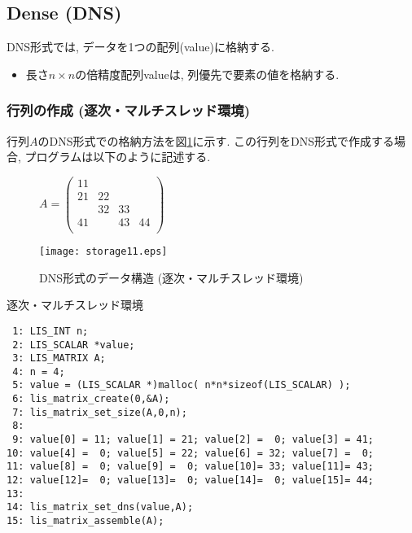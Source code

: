 \documentclass[a4paper]{jarticle}
\begin{document}
{{\newpage
\subsection{Dense (DNS)}
DNS形式では, データを1つの配列({\ttfamily value})に格納する. 
\begin{itemize}
\item 長さ$n \times n$の倍精度配列{\ttfamily value}は, 列優先で要素の値を格納する. 
\end{itemize}

\subsubsection{行列の作成 (逐次・マルチスレッド環境)}
行列$A$のDNS形式での格納方法を図\ref{fig:storage11}に示す. 
この行列をDNS形式で作成する場合, プログラムは以下のように記述する. 
\begin{figure}[h]
{\centering 
\begin{minipage}{0.3\textwidth}
\begin{flushright}
$ 
A = \left(
\begin{array}{cccc}
11 &    &    &    \\
21 & 22 &    &    \\
   & 32 & 33 &    \\
41 &    & 43 & 44 \\
\end{array}\right)
$
\end{flushright}
\end{minipage}
\begin{minipage}{0.6\textwidth}
\begin{flushleft}
\texttt{[image: storage11.eps]} 
\end{flushleft}
\end{minipage}
\caption{DNS形式のデータ構造 (逐次・マルチスレッド環境)}\label{fig:storage11}}
\end{figure}
\begin{itembox}[l]{逐次・マルチスレッド環境}
\small
\begin{verbatim}
 1: LIS_INT n;
 2: LIS_SCALAR *value;
 3: LIS_MATRIX A;
 4: n = 4;
 5: value = (LIS_SCALAR *)malloc( n*n*sizeof(LIS_SCALAR) );
 6: lis_matrix_create(0,&A);
 7: lis_matrix_set_size(A,0,n);
 8:
 9: value[0] = 11; value[1] = 21; value[2] =  0; value[3] = 41;
10: value[4] =  0; value[5] = 22; value[6] = 32; value[7] =  0;
11: value[8] =  0; value[9] =  0; value[10]= 33; value[11]= 43;
12: value[12]=  0; value[13]=  0; value[14]=  0; value[15]= 44;
13:
14: lis_matrix_set_dns(value,A);
15: lis_matrix_assemble(A);
\end{verbatim}
\end{itembox}

}}
\end{document}
